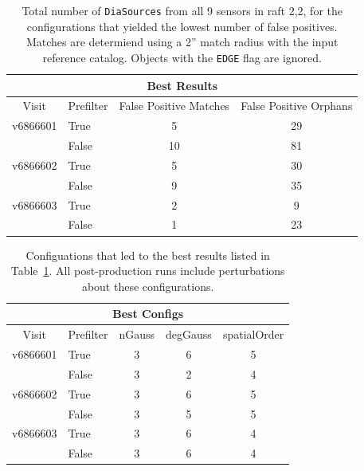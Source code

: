 \documentclass[prd, nofootinbib, floatfix, 11pt,tightenlines,times]{article}
\begin{document}
\clearpage



\clearpage
\begin{table}
\centering
\begin{tabular}{clcc}
\hline
\multicolumn{4}{|c|}{Best Results} \\
\hline
Visit    & Prefilter & False Positive Matches & False Positive Orphans \\
\hline
v6866601 & True      & 5                      & 29  \\
         & False     & 10                     & 81  \\
v6866602 & True      & 5                      & 30  \\
         & False     & 9                      & 35  \\
v6866603 & True      & 2                      & 9  \\
         & False     & 1                      & 23  \\
\end{tabular}
\caption{Total number of {\tt DiaSources} from all 9 sensors in raft
  2,2, for the configurations that yielded the lowest number of false
  positives.  Matches are determiend using a 2'' match radius with the
  input reference catalog.  Objects with the {\tt EDGE} flag are
  ignored. \label{tab-bestfp}}
\end{table}

\begin{table}
\centering
\begin{tabular}{clccc}
\hline
\multicolumn{5}{|c|}{Best Configs} \\
\hline
Visit    & Prefilter & nGauss & degGauss & spatialOrder \\
\hline
v6866601 & True      & 3      & 6        & 5 \\
         & False     & 3      & 2        & 4 \\
v6866602 & True      & 3      & 6        & 5 \\
         & False     & 3      & 5        & 5 \\
v6866603 & True      & 3      & 6        & 4 \\
         & False     & 3      & 6        & 4 \\
\end{tabular}
\caption{Configuations that led to the best results listed in
  Table~\ref{tab-bestfp}.  All post-production runs include
  perturbations about these configurations. \label{tab-bestconfig}}
\end{table}
\end{document}
